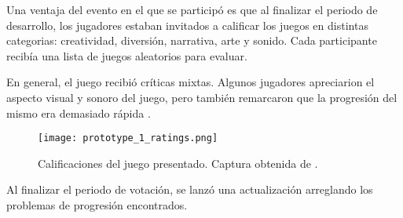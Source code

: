 \par Una ventaja del evento en el que se participó es que al finalizar el periodo de desarrollo, los jugadores estaban invitados a calificar los juegos en distintas categorias: creatividad, diversión, narrativa, arte y sonido. Cada participante recibía una lista de juegos aleatorios para evaluar.
\par En general, el juego recibió críticas mixtas. Algunos jugadores apreciarion el aspecto visual y sonoro del juego, pero también remarcaron que la progresión del mismo era demasiado rápida \cite{GrindGrindFollowtherules}.
\begin{figure}[H]
  \centering
  \texttt{[image: prototype\_1\_ratings.png]}
  \caption{Calificaciones del juego presentado. Captura obtenida de \cite{GrindGrindFollowtherules}.}
  \label{fig:x calificaciones prototipo 1} 
\end{figure}
\par Al finalizar el periodo de votación, se lanzó una actualización arreglando los problemas de progresión encontrados.  %
%
%
